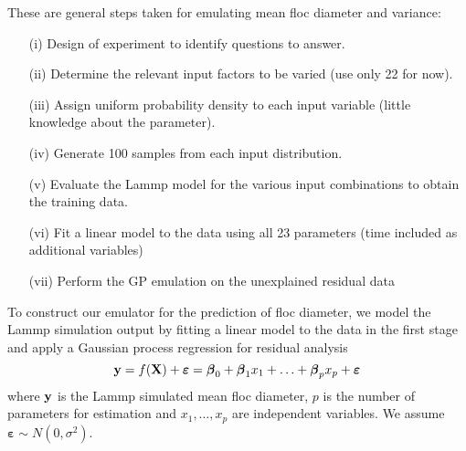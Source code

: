 \documentclass[12pt,titlepage]{report}
\newcommand{\by}{{\bf y}}
\theoremstyle{definition}
\theoremstyle{remark}
\begin{document}
These are general steps taken for emulating mean floc diameter and variance:
\begin{itemize}
\item[{(i)}] Design of experiment to identify questions to answer. 
\item[{(ii)}] Determine the relevant input factors to be varied (use only 22 for now). 
\item[{(iii)}] Assign uniform probability density to each input variable (little knowledge about the parameter). 
\item[{(iv)}] Generate 100 samples from each input distribution. 
\item[{(v)}] Evaluate the Lammp model for the various input combinations to obtain the training data.
\item[{(vi)}] Fit a linear model to the data using all 23 parameters (time included as additional variables)
\item[{(vii)}] Perform the GP emulation on the unexplained residual data
\end{itemize}

To construct our emulator for the prediction of floc diameter, we model the Lammp simulation output by fitting a linear model to the data in the first stage and apply a Gaussian process regression for residual analysis
\begin{equation}\label{geneq}
\by=f(\textbf{X})+\boldsymbol\varepsilon= \boldsymbol\beta_0+\boldsymbol\beta_{1}x_{1}+\ldots +\boldsymbol\beta_{p}x_{p}+\boldsymbol\varepsilon
\end{equation}
where $\by$ is the Lammp simulated mean floc diameter, $p$ is the number of parameters for estimation and $x_1,\ldots,x_p$ are independent variables. We assume $\boldsymbol \varepsilon \sim N(0, \sigma^2)$. 
\end{document}
